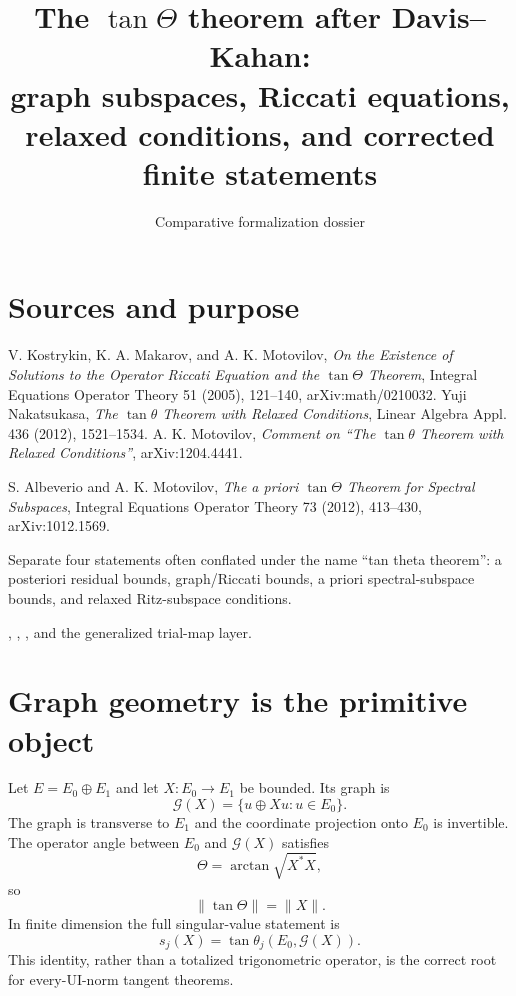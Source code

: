 
\title{The $\tan\Theta$ theorem after Davis--Kahan:\\graph subspaces, Riccati equations, relaxed conditions, and corrected finite statements}
\author{}
\date{Comparative formalization dossier}

\maketitle

\section*{Sources and purpose}
\begin{sourceguide}
\item[Primary sources] V. Kostrykin, K. A. Makarov, and A. K. Motovilov, \emph{On the Existence of Solutions to the Operator Riccati Equation and the $\tan\Theta$ Theorem}, Integral Equations Operator Theory 51 (2005), 121--140, arXiv:math/0210032. Yuji Nakatsukasa, \emph{The $\tan\theta$ Theorem with Relaxed Conditions}, Linear Algebra Appl. 436 (2012), 1521--1534. A. K. Motovilov, \emph{Comment on ``The $\tan\theta$ Theorem with Relaxed Conditions''}, arXiv:1204.4441.
\item[Companion source] S. Albeverio and A. K. Motovilov, \emph{The a priori $\tan\Theta$ Theorem for Spectral Subspaces}, Integral Equations Operator Theory 73 (2012), 413--430, arXiv:1012.1569.
\item[Purpose] Separate four statements often conflated under the name ``tan theta theorem'': a posteriori residual bounds, graph/Riccati bounds, a priori spectral-subspace bounds, and relaxed Ritz-subspace conditions.
\item[Formalization target] , , , and the generalized trial-map layer.
\end{sourceguide}

\section{Graph geometry is the primitive object}

Let $E=E_0\oplus E_1$ and let $X:E_0\to E_1$ be bounded. Its graph is
\[
  \mathcal G(X)=\{u\oplus Xu:u\in E_0\}.
\]
The graph is transverse to $E_1$ and the coordinate projection onto $E_0$ is invertible. The operator angle between $E_0$ and $\mathcal G(X)$ satisfies
\[
  \Theta=\arctan\sqrt{X^*X},
\]
so
\[
  \|\tan\Theta\|=\|X\|.
\]
In finite dimension the full singular-value statement is
\[
  s_j(X)=\tan\theta_j(E_0,\mathcal G(X)).
\]
This identity, rather than a totalized trigonometric operator, is the correct root for every-UI-norm tangent theorems.

